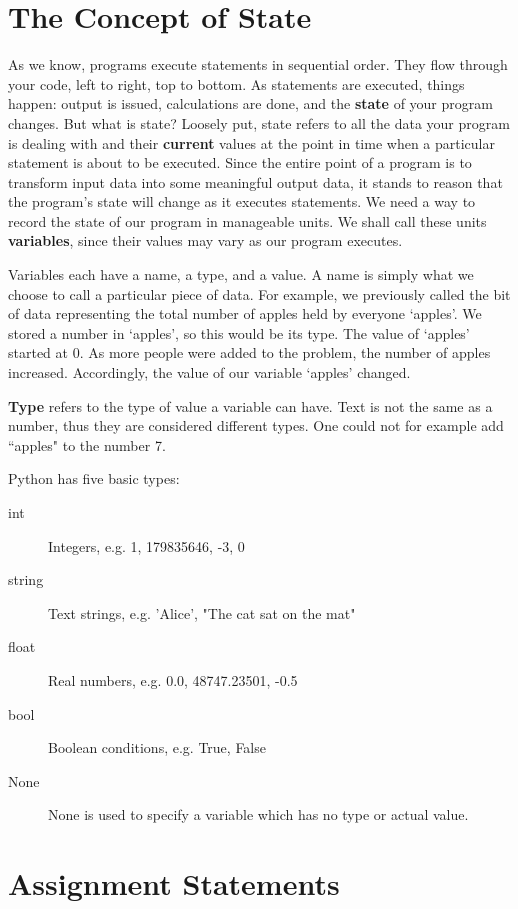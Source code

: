 \section{The Concept of State}

As we know, programs execute statements in sequential order. They flow through your code, left to right, top to bottom. As statements are executed, things happen: output is issued, calculations are done, and the \textbf{state} of your program changes. But what is state?   Loosely put, state refers to all the data your program is dealing with   and their \textbf{current} values at the point in time when a   particular statement is about to be executed. Since the entire point of a program is to transform input data into some meaningful output data, it stands to reason that the program's state will change as it executes statements. We need a way to record the state of our program in manageable units. We shall call these units   \textbf{variables}, since their values may vary as our program executes.

Variables each have a name, a type, and a value. A name is simply   what we choose to call a particular piece of data. For example, we   previously called the bit of data representing the total number of   apples held by everyone `apples'. We stored a number in `apples', so this would be its type. The value of `apples' started at 0. As more people were added to the problem, the number of apples   increased. Accordingly, the value of our variable   `apples' changed.

\textbf{Type} refers to the type of value a variable can   have. Text is not the same as a number, thus they are considered   different types. One could not for example add ``apples" to the number   7. 

Python has five basic types:
\begin{description}
	\item[int] Integers, e.g. 1, 179835646, -3, 0
	\item[string] Text strings, e.g. 'Alice', "The cat sat on the mat"
	\item[float] Real numbers, e.g. 0.0, 48747.23501, -0.5
	\item[bool] Boolean conditions, e.g. True, False
	\item[None] None is used to specify a variable which has no type or actual value.
\end{description}

\section{Assignment Statements}

